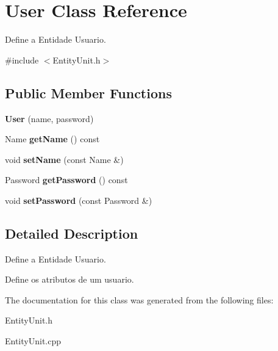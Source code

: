 \hypertarget{classUser}{\section{User Class Reference}
\label{classUser}
}


Define a Entidade Usuario.  




{\ttfamily \#include $<$Entity\-Unit.\-h$>$}

\subsection*{Public Member Functions}
\begin{DoxyCompactItemize}
\item 
\hypertarget{classUser_af01022473d6c8b84bb900dcc22680dc2}{{\bfseries User} (name, password)}\label{classUser_af01022473d6c8b84bb900dcc22680dc2}

\item 
\hypertarget{classUser_a207eca421d30023b3114d4fba6fa7fa0}{Name {\bfseries get\-Name} () const }\label{classUser_a207eca421d30023b3114d4fba6fa7fa0}

\item 
\hypertarget{classUser_a59baea733aca6a4c88cf7ffa037844b7}{void {\bfseries set\-Name} (const Name \&)}\label{classUser_a59baea733aca6a4c88cf7ffa037844b7}

\item 
\hypertarget{classUser_a7881ced623bfcfe9cda5deee5e461478}{Password {\bfseries get\-Password} () const }\label{classUser_a7881ced623bfcfe9cda5deee5e461478}

\item 
\hypertarget{classUser_aa14005abb811e52167513271055c5529}{void {\bfseries set\-Password} (const Password \&)}\label{classUser_aa14005abb811e52167513271055c5529}

\end{DoxyCompactItemize}


\subsection{Detailed Description}
Define a Entidade Usuario. 

Define os atributos de um usuario. 

The documentation for this class was generated from the following files\-:\begin{DoxyCompactItemize}
\item 
Entity\-Unit.\-h\item 
Entity\-Unit.\-cpp\end{DoxyCompactItemize}
